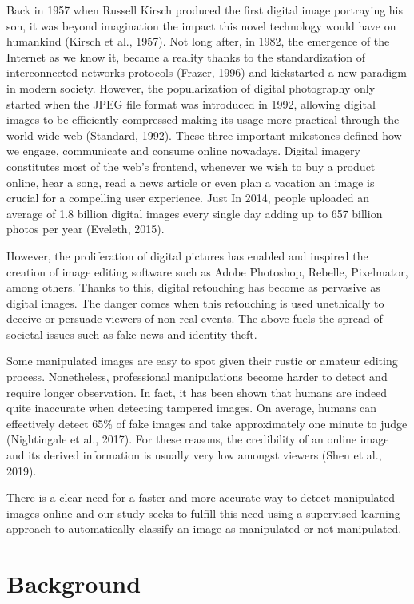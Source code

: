 \documentclass[11pt]{article}
\begin{document}
Back in 1957 when Russell Kirsch produced the first digital image portraying his son, it was beyond imagination the impact this novel technology would have on humankind (Kirsch et al., 1957). Not long after, in 1982, the emergence of the Internet as we know it, became a reality thanks to the standardization of interconnected networks protocols (Frazer, 1996) and kickstarted a new paradigm in modern society. However, the popularization of digital photography only started when the JPEG file format was introduced in 1992, allowing digital images to be efficiently compressed making its usage more practical through the world wide web (Standard, 1992). These three important milestones defined how we engage, communicate and consume online nowadays. Digital imagery constitutes most of the web’s frontend, whenever we wish to buy a product online, hear a song, read a news article or even plan a vacation an image is crucial for a compelling user experience. Just In 2014, people uploaded an average of 1.8 billion digital images every single day adding up to 657 billion photos per year (Eveleth, 2015).

However, the proliferation of digital pictures has enabled and inspired the creation of image editing software such as Adobe Photoshop, Rebelle, Pixelmator, among others. Thanks to this,  digital retouching has become as pervasive as digital images. The danger comes when this retouching is used unethically to deceive or persuade viewers of non-real events. The above fuels the spread of societal issues such as fake news and identity theft.

Some manipulated images are easy to spot given their rustic or amateur editing process. Nonetheless, professional manipulations become harder to detect and require longer observation. In fact, it has been shown that humans are indeed quite inaccurate when detecting tampered images. On average, humans can effectively detect 65\% of fake images and take approximately one minute to judge (Nightingale et al., 2017). For these reasons, the credibility of an online image and its derived information is usually very low amongst viewers (Shen et al., 2019).

There is a clear need for a faster and more accurate way to detect manipulated images online and our study seeks to fulfill this need using a supervised learning approach to automatically classify an image as manipulated or not manipulated.


\section{Background}
\end{document}
